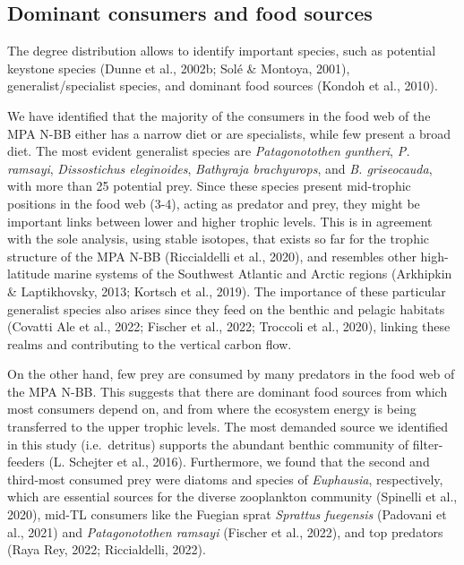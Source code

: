 \documentclass[preprint, 3p,
authoryear]{elsarticle} %
\begin{document}
\hypertarget{dominant-consumers-and-food-sources}{%
\subsection{Dominant consumers and food
sources}\label{dominant-consumers-and-food-sources}}

The degree distribution allows to identify important species, such as
potential keystone species (Dunne et al., 2002b; Solé \& Montoya, 2001),
generalist/specialist species, and dominant food sources (Kondoh et al.,
2010).

We have identified that the majority of the consumers in the food web of
the MPA N-BB either has a narrow diet or are specialists, while few
present a broad diet. The most evident generalist species are
\emph{Patagonotothen guntheri}, \emph{P. ramsayi}, \emph{Dissostichus
eleginoides}, \emph{Bathyraja brachyurops}, and \emph{B. griseocauda},
with more than 25 potential prey. Since these species present
mid-trophic positions in the food web (3-4), acting as predator and
prey, they might be important links between lower and higher trophic
levels. This is in agreement with the sole analysis, using stable
isotopes, that exists so far for the trophic structure of the MPA N-BB
(Riccialdelli et al., 2020), and resembles other high-latitude marine
systems of the Southwest Atlantic and Arctic regions (Arkhipkin \&
Laptikhovsky, 2013; Kortsch et al., 2019). The importance of these
particular generalist species also arises since they feed on the benthic
and pelagic habitats (Covatti Ale et al., 2022; Fischer et al., 2022;
Troccoli et al., 2020), linking these realms and contributing to the
vertical carbon flow.

On the other hand, few prey are consumed by many predators in the food
web of the MPA N-BB. This suggests that there are dominant food sources
from which most consumers depend on, and from where the ecosystem energy
is being transferred to the upper trophic levels. The most demanded
source we identified in this study (i.e.~detritus) supports the abundant
benthic community of filter-feeders (L. Schejter et al., 2016).
Furthermore, we found that the second and third-most consumed prey were
diatoms and species of \emph{Euphausia}, respectively, which are
essential sources for the diverse zooplankton community (Spinelli et
al., 2020), mid-TL consumers like the Fuegian sprat \emph{Sprattus
fuegensis} (Padovani et al., 2021) and \emph{Patagonotothen ramsayi}
(Fischer et al., 2022), and top predators (Raya Rey, 2022; Riccialdelli,
2022).
\end{document}
